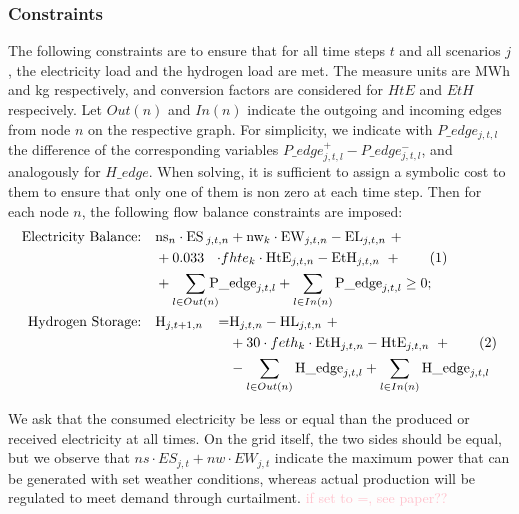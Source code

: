 
\subsubsection{Constraints}
The following constraints are to ensure that for all time steps $t$ and all scenarios $j$, the electricity load and the hydrogen load are met. The measure units are MWh and kg respectively, and conversion factors are considered for $HtE$ and $EtH$ respecively.
Let $Out(n)$ and $In(n)$ indicate the outgoing and incoming edges from node $n$ on the respective graph. For simplicity, we indicate with $P\_edge_{j,t,l}$ the difference of the corresponding variables $P\_edge^+_{j,t,l}-P\_edge^-_{j,t,l}$, and analogously for $H\_edge$. When solving, it is sufficient to assign a symbolic cost to them to ensure that only one of them is non zero at each time step. Then for each node $n$, the following flow balance constraints are imposed:
\begin{align*}
    \text{Electricity Balance:} \quad & \text{ns}_n \cdot \text{ES}\hspace{-1.2em}&_{j,t,n}&+ \text{nw}_k \cdot \text{EW}_{j,t,n} - \text{EL}_{j,t,n} \ + \\
    &  + 0.033\hspace{-2em}& \cdot f&hte_k \cdot \text{HtE}_{j,t,n} - \text{EtH}_{j,t,n}\ + \stepcounter{equation}\tag{\theequation}\label{constr_P}\\
    & + \sum_{l\in Out(n)}\hspace{-1.9em}&\text{P\_}&\text{edge}_{j,t,l} + \sum_{l\in In(n)} \text{P\_edge}_{j,t,l} \ge 0;\\
    \text{Hydrogen Storage:} \quad & \text{H}_{j,t+1,n} \hspace{-5em}&=& \text{H}_{j,t,n} - \text{HL}_{j,t,n}\ +\\ 
    &&& + 30 \cdot feth_k \cdot \text{EtH}_{j,t,n} - \text{HtE}_{j,t,n} \ + \stepcounter{equation}\tag{\theequation}\label{constr_H}\\
    &&& - \sum_{l\in Out(n)}\text{H\_edge}_{j,t,l} + \sum_{l\in In(n)}\text{H\_edge}_{j,t,l}
\end{align*}

We ask that the consumed electricity be less or equal than the produced or received electricity at all times. On the grid itself, the two sides should be equal, but we observe that $ns\cdot ES_{j,t} + nw\cdot EW_{j,t}$ indicate the maximum power that can be generated with set weather conditions, whereas actual production will be regulated to meet demand through curtailment. \textcolor{pink}{if set to =, see paper??}

